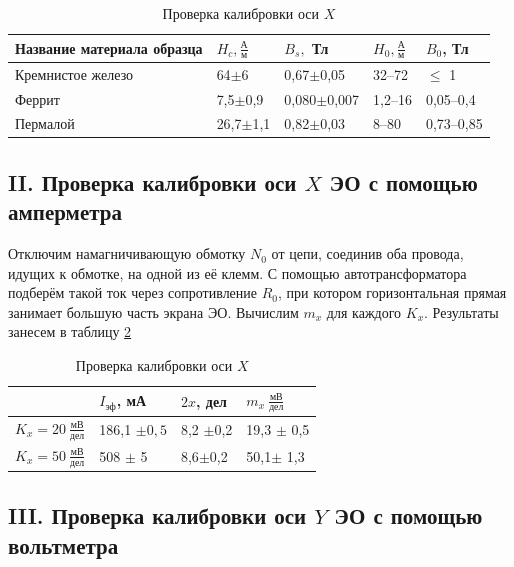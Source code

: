\documentclass[a4paper,10pt]{article}
\begin{document}
\begin{table}[h!]
	\centering
	\caption{Проверка калибровки оси $X$} \label{data5}
\begin{tabular}{|l|l|l|l|l|}
	\hline
	Название материала образца & $H_c,\frac{\text{А}}{\text{м}}$ & $B_s,$ Тл & $H_0,\frac{\text{А}}{\text{м}}$ & $B_0$, Тл \\ \hline
	Кремнистое железо          & 64$\pm$6 & 0,67$\pm$0,05 & 32--72\cite{g}   &  $\leq$ 1\\ \hline
	Феррит                     & 7,5$\pm$0,9 & 0,080$\pm$0,007 & 1,2--16\cite{a}  & 0,05--0,4 \\ \hline
	Пермалой                   & 26,7$\pm$1,1 & 0,82$\pm$0,03 & 8--80 \cite{f}  & 0,73--0,85 \\ \hline
\end{tabular}
\end{table}


\subsection*{II. Проверка калибровки оси $X$ ЭО с помощью амперметра}

Отключим намагничивающую обмотку $N_0$ от цепи, соединив оба провода, идущих к обмотке, на одной из её клемм. С помощью автотрансформатора подберём такой ток через сопротивление $R_0$, при котором горизонтальная прямая занимает большую часть экрана ЭО. Вычислим $m_x$ для каждого $K_x$. Результаты занесем в таблицу \ref{data2}

\begin{table}[h!]
	\centering
	\caption{Проверка калибровки оси $X$} \label{data2}
	\begin{tabular}{|l|l|l|l|}
		\hline
		           & $I_{\text{эф}}$, мА & $2x$, дел & $m_x~\frac{\text{мВ}}{\text{дел}}$ \\ \hline
		$K_x = 20~\frac{\text{мВ}}{\text{дел}}$  & 186,1 $\pm 0,5$ & 8,2 $\pm$0,2 & 19,3 $\pm$ 0,5 \\ \hline
		$K_x = 50~\frac{\text{мВ}}{\text{дел}}$  & 508 $\pm$ 5 & 8,6$\pm$0,2  & 50,1$\pm$ 1,3 \\ \hline
	\end{tabular}
\end{table}

\subsection*{III. Проверка калибровки оси $Y$ ЭО с помощью вольтметра}
\end{document}
